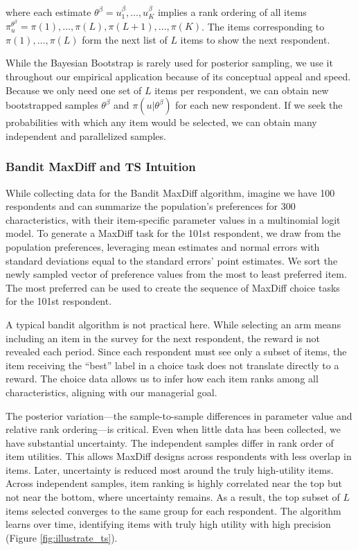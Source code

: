 \documentclass[nonblindrev]{informs3}
\newcommand{\ts}{\textbf{TS} }
\newcommand{\numperset}{L}
\begin{document}
where each estimate $\theta^\beta = u_1^\beta, \ldots, u_K^\beta$ implies a rank ordering of all items $\pi_{u}^{\theta^\beta} = \pi(1),\ldots,\pi(\numperset),\pi(\numperset+1),\ldots,\pi(K)$. The items corresponding to $\pi(1),\ldots,\pi(\numperset)$ form the next list of $\numperset$ items to show the next respondent. 

While the Bayesian Bootstrap is rarely used for posterior sampling, we use it throughout our empirical application because of its conceptual appeal and speed. Because we only need one set of $\numperset$ items per respondent, we can obtain new bootstrapped samples $\theta^{\beta}$ and $\pi(u|\theta^\beta)$ for each new respondent. If we seek the probabilities with which any item would be selected, we can obtain many independent and parallelized samples. 

\subsubsection{Bandit MaxDiff and \ts Intuition }

While collecting data for the Bandit MaxDiff algorithm, imagine we have 100 respondents and can summarize the population's preferences for 300 characteristics, with their item-specific parameter values in a multinomial logit model. To generate a MaxDiff task for the 101st respondent, we draw from the population preferences, leveraging mean estimates and normal errors with standard deviations equal to the standard errors' point estimates. We sort the newly sampled vector of preference values from the most to least preferred item. The most preferred can be used to create the sequence of MaxDiff choice tasks for the 101st respondent.

A typical bandit algorithm is not practical here. While selecting an arm means including an item in the survey for the next respondent, the reward is not revealed each period. Since each respondent must see only a subset of items, the item receiving the ``best'' label in a choice task does not translate directly to a reward. The choice data allows us to infer how each item ranks among all characteristics, aligning with our managerial goal.

The posterior variation---the sample-to-sample differences in parameter value and relative rank ordering---is critical. Even when little data has been collected, we have substantial uncertainty. The independent samples differ in rank order of item utilities. This allows MaxDiff designs across respondents with less overlap in items. Later, uncertainty is reduced most around the truly high-utility items. Across independent samples, item ranking is highly correlated near the top but not near the bottom, where uncertainty remains. As a result, the top subset of $\numperset$ items selected converges to the same group for each respondent. The algorithm learns over time, identifying items with truly high utility with high precision (Figure \ref{fig:illustrate_ts}). 
\end{document}
